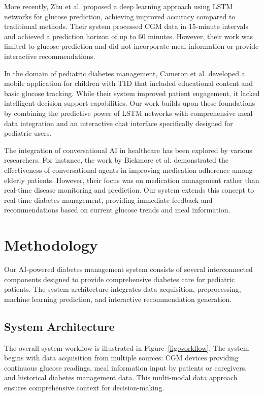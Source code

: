 \documentclass[acmsmall]{acmart}
\begin{document}
More recently, Zhu et al. \cite{Zhu2019} proposed a deep learning approach using LSTM networks for glucose prediction, achieving improved accuracy compared to traditional methods. Their system processed CGM data in 15-minute intervals and achieved a prediction horizon of up to 60 minutes. However, their work was limited to glucose prediction and did not incorporate meal information or provide interactive recommendations.

In the domain of pediatric diabetes management, Cameron et al. \cite{Cameron2018} developed a mobile application for children with T1D that included educational content and basic glucose tracking. While their system improved patient engagement, it lacked intelligent decision support capabilities. Our work builds upon these foundations by combining the predictive power of LSTM networks with comprehensive meal data integration and an interactive chat interface specifically designed for pediatric users.

The integration of conversational AI in healthcare has been explored by various researchers. For instance, the work by Bickmore et al. \cite{Bickmore2018} demonstrated the effectiveness of conversational agents in improving medication adherence among elderly patients. However, their focus was on medication management rather than real-time disease monitoring and prediction. Our system extends this concept to real-time diabetes management, providing immediate feedback and recommendations based on current glucose trends and meal information.

\section{Methodology}

Our AI-powered diabetes management system consists of several interconnected components designed to provide comprehensive diabetes care for pediatric patients. The system architecture integrates data acquisition, preprocessing, machine learning prediction, and interactive recommendation generation.

\subsection{System Architecture}

The overall system workflow is illustrated in Figure~\ref{fig:workflow}. The system begins with data acquisition from multiple sources: CGM devices providing continuous glucose readings, meal information input by patients or caregivers, and historical diabetes management data. This multi-modal data approach ensures comprehensive context for decision-making.
\end{document}

